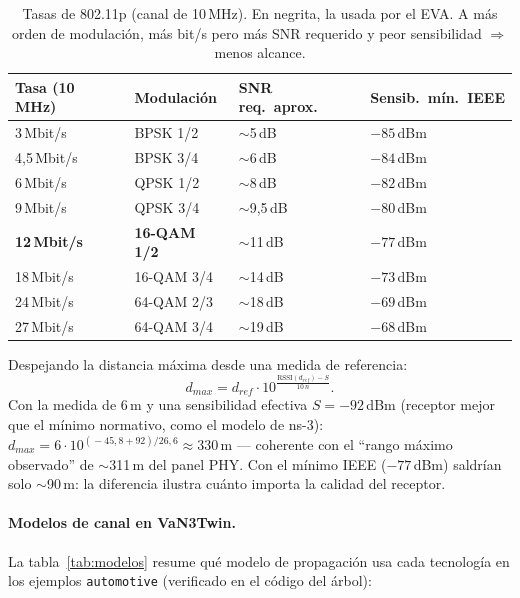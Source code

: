 \documentclass[11pt,a4paper]{article}
\begin{document}
\begin{table}[h!]
\centering\small
\begin{tabular}{@{}llll@{}}
\toprule
\textbf{Tasa (10 MHz)} & \textbf{Modulación} & \textbf{SNR req.\ aprox.} & \textbf{Sensib.\ mín.\ IEEE} \\
\midrule
3\,Mbit/s  & BPSK 1/2   & $\sim$5\,dB  & $-85$\,dBm \\
4,5\,Mbit/s& BPSK 3/4   & $\sim$6\,dB  & $-84$\,dBm \\
6\,Mbit/s  & QPSK 1/2   & $\sim$8\,dB  & $-82$\,dBm \\
9\,Mbit/s  & QPSK 3/4   & $\sim$9{,}5\,dB & $-80$\,dBm \\
\textbf{12\,Mbit/s} & \textbf{16-QAM 1/2} & $\sim$11\,dB & $-77$\,dBm \\
18\,Mbit/s & 16-QAM 3/4 & $\sim$14\,dB & $-73$\,dBm \\
24\,Mbit/s & 64-QAM 2/3 & $\sim$18\,dB & $-69$\,dBm \\
27\,Mbit/s & 64-QAM 3/4 & $\sim$19\,dB & $-68$\,dBm \\
\bottomrule
\end{tabular}
\caption{Tasas de 802.11p (canal de 10\,MHz). En negrita, la usada por el
EVA. A más orden de modulación, más bit/s pero más SNR requerido y peor
sensibilidad $\Rightarrow$ menos alcance.}
\label{tab:sens}
\end{table}

Despejando la distancia máxima desde una medida de referencia:
\[ d_{max} = d_{ref}\cdot 10^{\frac{\mathrm{RSSI}(d_{ref})-S}{10\,n}}. \]
Con la medida de 6\,m y una sensibilidad efectiva $S=-92$\,dBm (receptor
mejor que el mínimo normativo, como el modelo de ns-3):
$d_{max} = 6 \cdot 10^{(\!-45{,}8+92)/26{,}6} \approx 330$\,m --- coherente
con el ``rango máximo observado'' de $\sim$311\,m del panel PHY. Con el
mínimo IEEE ($-77$\,dBm) saldrían solo $\sim$90\,m: la diferencia ilustra
cuánto importa la calidad del receptor.

\paragraph{Modelos de canal en VaN3Twin.} La tabla~\ref{tab:modelos} resume
qué modelo de propagación usa cada tecnología en los ejemplos
\texttt{automotive} (verificado en el código del árbol):
\end{document}
